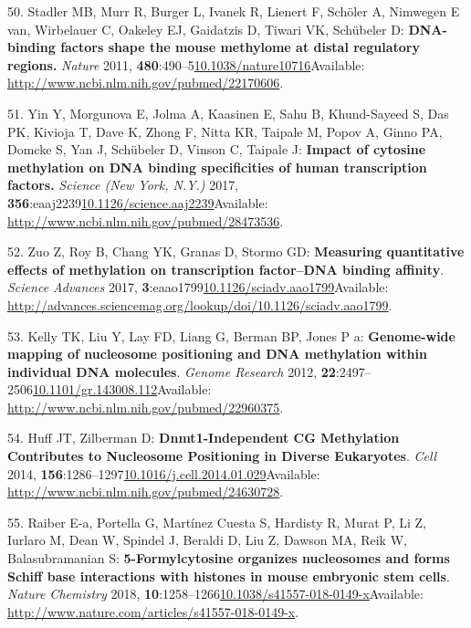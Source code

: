 \documentclass[
]{book}
\begin{document}
\leavevmode\hypertarget{ref-Stadler2011}{}%
50. Stadler MB, Murr R, Burger L, Ivanek R, Lienert F, Schöler A, Nimwegen E van, Wirbelauer C, Oakeley EJ, Gaidatzis D, Tiwari VK, Schübeler D: \textbf{DNA-binding factors shape the mouse methylome at distal regulatory regions.} \emph{Nature} 2011, \textbf{480}:490--5\href{https://doi.org/10.1038/nature10716}{10.1038/nature10716}Available: \url{http://www.ncbi.nlm.nih.gov/pubmed/22170606}.

\leavevmode\hypertarget{ref-Yin2017}{}%
51. Yin Y, Morgunova E, Jolma A, Kaasinen E, Sahu B, Khund-Sayeed S, Das PK, Kivioja T, Dave K, Zhong F, Nitta KR, Taipale M, Popov A, Ginno PA, Domcke S, Yan J, Schübeler D, Vinson C, Taipale J: \textbf{Impact of cytosine methylation on DNA binding specificities of human transcription factors.} \emph{Science (New York, N.Y.)} 2017, \textbf{356}:eaaj2239\href{https://doi.org/10.1126/science.aaj2239}{10.1126/science.aaj2239}Available: \url{http://www.ncbi.nlm.nih.gov/pubmed/28473536}.

\leavevmode\hypertarget{ref-Zuo2017}{}%
52. Zuo Z, Roy B, Chang YK, Granas D, Stormo GD: \textbf{Measuring quantitative effects of methylation on transcription factor--DNA binding affinity}. \emph{Science Advances} 2017, \textbf{3}:eaao1799\href{https://doi.org/10.1126/sciadv.aao1799}{10.1126/sciadv.aao1799}Available: \url{http://advances.sciencemag.org/lookup/doi/10.1126/sciadv.aao1799}.

\leavevmode\hypertarget{ref-Kelly2012}{}%
53. Kelly TK, Liu Y, Lay FD, Liang G, Berman BP, Jones P a: \textbf{Genome-wide mapping of nucleosome positioning and DNA methylation within individual DNA molecules}. \emph{Genome Research} 2012, \textbf{22}:2497--2506\href{https://doi.org/10.1101/gr.143008.112}{10.1101/gr.143008.112}Available: \url{http://www.ncbi.nlm.nih.gov/pubmed/22960375}.

\leavevmode\hypertarget{ref-Huff2014}{}%
54. Huff JT, Zilberman D: \textbf{Dnmt1-Independent CG Methylation Contributes to Nucleosome Positioning in Diverse Eukaryotes}. \emph{Cell} 2014, \textbf{156}:1286--1297\href{https://doi.org/10.1016/j.cell.2014.01.029}{10.1016/j.cell.2014.01.029}Available: \url{http://www.ncbi.nlm.nih.gov/pubmed/24630728}.

\leavevmode\hypertarget{ref-Raiber2017}{}%
55. Raiber E-a, Portella G, Martínez Cuesta S, Hardisty R, Murat P, Li Z, Iurlaro M, Dean W, Spindel J, Beraldi D, Liu Z, Dawson MA, Reik W, Balasubramanian S: \textbf{5-Formylcytosine organizes nucleosomes and forms Schiff base interactions with histones in mouse embryonic stem cells}. \emph{Nature Chemistry} 2018, \textbf{10}:1258--1266\href{https://doi.org/10.1038/s41557-018-0149-x}{10.1038/s41557-018-0149-x}Available: \url{http://www.nature.com/articles/s41557-018-0149-x}.
\end{document}
